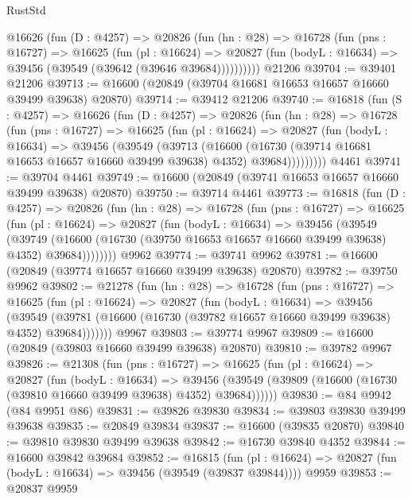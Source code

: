 \begin{lexlean}{RustStd}
\begin{coremodule}
      @16626
        (fun (D : @4257) =>
        @20826
          (fun (hn : @28) =>
          @16728
            (fun (pns : @16727) =>
            @16625
              (fun (pl : @16624) =>
              @20827 (fun (bodyL : @16634) => @39456 (@39549 (@39642 (@39646 @39684))))))))))
    @21206
@39704 := @39401 @21206
@39713 := @16600 (@20849 (@39704 @16681 @16653 @16657 @16660 @39499 @39638) @20870)
@39714 := @39412 @21206
@39740 := @16818
    (fun (S : @4257) =>
    @16626
      (fun (D : @4257) =>
      @20826
        (fun (hn : @28) =>
        @16728
          (fun (pns : @16727) =>
          @16625
            (fun (pl : @16624) =>
            @20827
              (fun (bodyL : @16634) =>
              @39456
                (@39549
                  (@39713
                    (@16600
                      (@16730 (@39714 @16681 @16653 @16657 @16660 @39499 @39638) @4352)
                      @39684)))))))))
    @4461
@39741 := @39704 @4461
@39749 := @16600 (@20849 (@39741 @16653 @16657 @16660 @39499 @39638) @20870)
@39750 := @39714 @4461
@39773 := @16818
    (fun (D : @4257) =>
    @20826
      (fun (hn : @28) =>
      @16728
        (fun (pns : @16727) =>
        @16625
          (fun (pl : @16624) =>
          @20827
            (fun (bodyL : @16634) =>
            @39456
              (@39549
                (@39749
                  (@16600 (@16730 (@39750 @16653 @16657 @16660 @39499 @39638) @4352) @39684))))))))
    @9962
@39774 := @39741 @9962
@39781 := @16600 (@20849 (@39774 @16657 @16660 @39499 @39638) @20870)
@39782 := @39750 @9962
@39802 := @21278
    (fun (hn : @28) =>
    @16728
      (fun (pns : @16727) =>
      @16625
        (fun (pl : @16624) =>
        @20827
          (fun (bodyL : @16634) =>
          @39456
            (@39549
              (@39781 (@16600 (@16730 (@39782 @16657 @16660 @39499 @39638) @4352) @39684)))))))
    @9967
@39803 := @39774 @9967
@39809 := @16600 (@20849 (@39803 @16660 @39499 @39638) @20870)
@39810 := @39782 @9967
@39826 := @21308
    (fun (pns : @16727) =>
    @16625
      (fun (pl : @16624) =>
      @20827
        (fun (bodyL : @16634) =>
        @39456 (@39549 (@39809 (@16600 (@16730 (@39810 @16660 @39499 @39638) @4352) @39684))))))
@39830 := @84 @9942 (@84 @9951 @86)
@39831 := @39826 @39830
@39834 := @39803 @39830 @39499 @39638
@39835 := @20849 @39834
@39837 := @16600 (@39835 @20870)
@39840 := @39810 @39830 @39499 @39638
@39842 := @16730 @39840 @4352
@39844 := @16600 @39842 @39684
@39852 := @16815
    (fun (pl : @16624) => @20827 (fun (bodyL : @16634) => @39456 (@39549 (@39837 @39844))))
    @9959
@39853 := @20837 @9959

\end{coremodule}
\end{lexlean}
